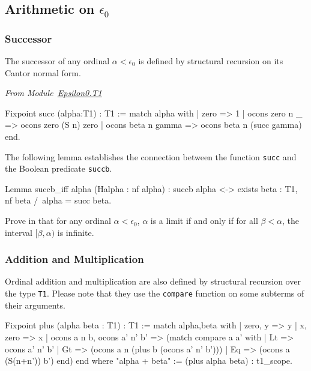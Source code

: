 \subsection{Arithmetic on \texorpdfstring{$\epsilon_0$}{epsilon0}}
\subsubsection{Successor}

The successor of any ordinal $\alpha< \epsilon_0$ is defined by structural 
recursion on its Cantor normal form.

\label{Functions:succ-T1}

\vspace{4pt}
\emph{From Module~\href{../theories/html/hydras.Epsilon0.T1.html\#succ}{Epsilon0.T1}}

\begin{Coqsrc}
Fixpoint succ (alpha:T1) : T1 :=
  match alpha with 
   | zero => 1
   | ocons zero n _ => ocons zero (S n) zero
   | ocons beta n gamma => ocons beta n (succ gamma)
 end.
\end{Coqsrc}


The following lemma establishes the connection between the  function
\texttt{succ} and the Boolean predicate \texttt{succb}.


\begin{Coqsrc}
 Lemma succb_iff alpha (Halpha : nf alpha) :
  succb alpha <-> exists beta : T1, nf beta /\ alpha = succ  beta.
\end{Coqsrc}

 \begin{exercise}
Prove in \coq{} that for any ordinal $\alpha<\epsilon_0$, $\alpha$ is a limit if 
and only if for all $\beta<\alpha$, the interval $[\beta,\alpha)$ is infinite.
 \end{exercise}


\subsubsection{Addition and Multiplication}

Ordinal addition and multiplication are also defined by structural recursion over the type \texttt{T1}. Please note that they use the \texttt{compare} function on some subterms of their arguments.

\label{sect:infix-plus-T1}

\begin{Coqsrc}
Fixpoint plus (alpha beta : T1) : T1 :=
  match alpha,beta with
 |  zero, y  => y
 |  x, zero  => x
 |  ocons a n b, ocons a' n' b' =>
    (match compare a a' with
     | Lt => ocons a' n' b'
     | Gt => (ocons a n (plus b (ocons a' n' b')))
     | Eq  => (ocons a (S(n+n')) b')
     end)
  end
where "alpha + beta" := (plus alpha beta) : t1_scope.
\end{Coqsrc}

